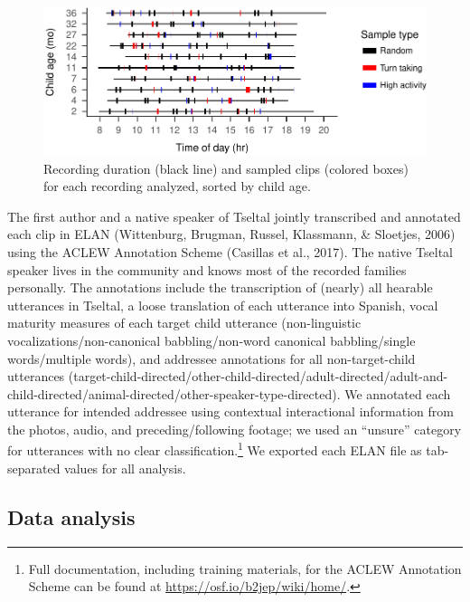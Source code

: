 \documentclass[floatsintext,man]{apa6}
\theoremstyle{definition}
\theoremstyle{definition}
\theoremstyle{definition}
\theoremstyle{remark}
\begin{document}
\begin{figure}

{\centering \includegraphics{Tseltal-CLE_files/figure-latex/fig2-1} 

}

\caption{Recording duration (black line) and sampled clips (colored boxes) for each recording analyzed, sorted by child age.}\label{fig:fig2}
\end{figure}

The first author and a native speaker of Tseltal jointly transcribed and
annotated each clip in ELAN (Wittenburg, Brugman, Russel, Klassmann, \&
Sloetjes, 2006) using the ACLEW Annotation Scheme (Casillas et al.,
2017). The native Tseltal speaker lives in the community and knows most
of the recorded families personally. The annotations include the
transcription of (nearly) all hearable utterances in Tseltal, a loose
translation of each utterance into Spanish, vocal maturity measures of
each target child utterance (non-linguistic vocalizations/non-canonical
babbling/non-word canonical babbling/single words/multiple words), and
addressee annotations for all non-target-child utterances
(target-child-directed/other-child-directed/adult-directed/adult-and-child-directed/animal-directed/other-speaker-type-directed).
We annotated each utterance for intended addressee using contextual
interactional information from the photos, audio, and
preceding/following footage; we used an \enquote{unsure} category for
utterances with no clear classification.\footnote{Full documentation,
  including training materials, for the ACLEW Annotation Scheme can be
  found at \url{https://osf.io/b2jep/wiki/home/}.} We exported each ELAN
file as tab-separated values for all analysis.

\subsection{Data analysis}\label{methods-analysisinfo}
\end{document}
